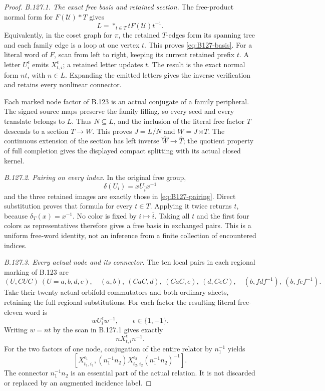 \begin{proof}
\emph{B.127.1. The exact free basis and retained section.}
The free-product normal form for \(F(\mathcal U)*T\) gives
\[
 L=\mathop{*}_{t\in T}tF(\mathcal U)t^{-1}.
\]
Equivalently, in the coset graph for \(\pi\), the retained
\(T\)-edges form its spanning tree and each family edge is a
loop at one vertex \(t\). This proves \eqref{eq:B127-basis}.
For a literal word of \(F\), scan from left to right, keeping
its current retained prefix \(t\). A letter
\(U_i^\epsilon\) emits \(X_{t,i}^\epsilon\); a retained letter
updates \(t\). The result is the exact normal form \(nt\),
with \(n\in L\). Expanding the emitted letters gives the
inverse verification and retains every nonlinear connector.

Each marked node factor of B.123 is an actual conjugate of a
family peripheral. The signed source maps preserve the family
filling, so every seed and every translate belongs to \(L\).
Thus \(N\subseteq L\), and the inclusion of the literal free
factor \(T\) descends to a section \(T\to W\). This proves
\(J=L/N\) and \(W=J\rtimes T\). The continuous extension of the
section has left inverse \(\widehat W\to\widehat T\); the
quotient property of full completion gives the displayed
compact splitting with its actual closed kernel.

\emph{B.127.2. Pairing on every index.}
In the original free group,
\[
 \delta(U_i)=xU_{\bar i}x^{-1}
\]
and the three retained images are exactly those in
\eqref{eq:B127-pairing}. Direct substitution proves that formula
for every \(t\in T\). Applying it twice returns \(t\), because
\(\delta_T(x)=x^{-1}\). No color is fixed by \(i\mapsto\bar i\).
Taking all \(t\) and the first four colors as representatives
therefore gives a free basis in exchanged pairs. This is a
uniform free-word identity, not an inference from a finite
collection of encountered indices.

\emph{B.127.3. Every actual node and its connector.}
The ten local pairs in each regional marking of B.123 are
\[
 (U,CUC)\ (U=a,b,d,e),\quad
 (a,b),\ (CaC,d),\ (CaC,e),\ (d,CeC),\quad
 (b,fdf^{-1}),\ (b,fef^{-1}).
\]
Take their twenty actual orbifold commutators and both ordinary
sheets, retaining the full regional substitutions. For each
factor the resulting literal free-eleven word is
\[
 wU_i^\epsilon w^{-1},\qquad \epsilon\in\{1,-1\}.
\]
Writing \(w=nt\) by the scan in B.127.1 gives exactly
\[
 nX_{t,i}^{\epsilon}n^{-1}.
\]
For the two factors of one node, conjugation of the entire
relator by \(n_1^{-1}\) yields
\begin{equation}\label{eq:B127-connector}
 [X_{t_1,i_1}^{\epsilon_1},
   (n_1^{-1}n_2)X_{t_2,i_2}^{\epsilon_2}(n_1^{-1}n_2)^{-1}].
\end{equation}
The connector \(n_1^{-1}n_2\) is an essential part of the
actual relation. It is not discarded or replaced by an
augmented incidence label.


\end{proof}
